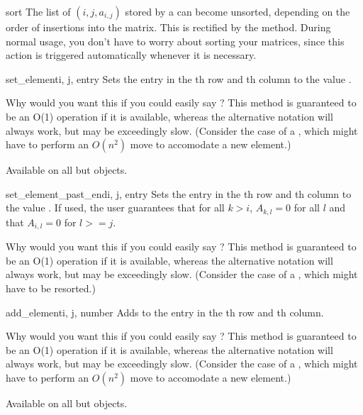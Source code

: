 \begin{methoddesc}[SparseBuildMatrix]{sort}{}
  The list of $(i,j,a_{i,j})$ stored by a 
  can become unsorted, depending on the order of insertions into the
  matrix.  This is rectified by the  method. During
  normal usage, you don't have to worry about sorting your matrices,
  since this action is triggered automatically whenever it is
  necessary.
\end{methoddesc}
\begin{methoddesc}{set_element}{i, j, entry}
  Sets the entry in the th row and th column to the
  value .

  Why would you want this if you could easily say ? This method is guaranteed to be an O(1) operation if it is
  available, whereas the alternative notation will always work, but
  may be exceedingly slow. (Consider the case of a
  , which might have to perform an $O(n^2)$
  move to accomodate a new element.)

  Available on all but  objects.
\end{methoddesc}
\begin{methoddesc}[Matrix]{set_element_past_end}{i, j, entry}
  Sets the entry in the th row and th column to the
  value . If used, the user guarantees that for all
  $k>i$, $A_{k,l}=0$ for all $l$ and that $A_{i,l}=0$ for $l>=j$.

  Why would you want this if you could easily say ? This method is guaranteed to be an O(1) operation if 
  it is available, whereas the alternative notation will always
  work, but may be exceedingly slow. (Consider the case of a
  , which might have to be resorted.)
\end{methoddesc}
\begin{methoddesc}[Matrix]{add_element}{i, j, number}
  Adds  to the entry in the th row and th
  column.

  Why would you want this if you could easily say ? This method is guaranteed to be an O(1) operation if it is
  available, whereas the alternative notation will always work, but
  may be exceedingly slow. (Consider the case of a
  , which might have to perform an $O(n^2)$
  move to accomodate a new element.)

  Available on all but  objects.
\end{methoddesc}
